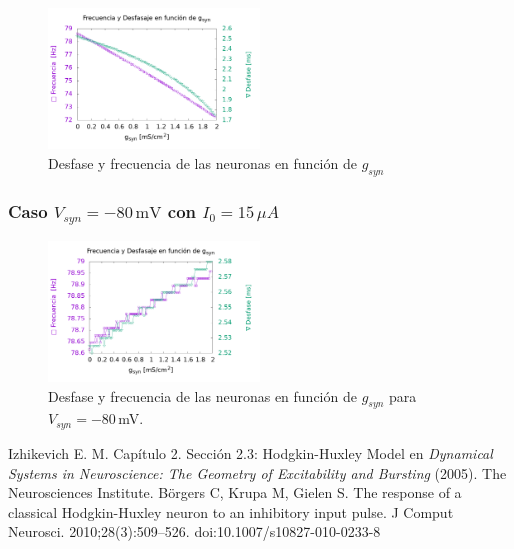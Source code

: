     \begin{figure}[H]
            \centering
            \includegraphics[width=0.5\textwidth]{../Graficos/current_15.png}
            \caption{Desfase y frecuencia de las neuronas en función de $g_{syn}$}
            \label{fig:des_fre}
        \end{figure}   


    \subsubsection{Caso \texorpdfstring{$V_{syn}= -80\,\text{mV}$}{}   con  \texorpdfstring{$I_0 = 15\,\mu A$}{}}


    \begin{figure}[H]
            \centering
            \includegraphics[width=0.5\textwidth]{../Graficos/current_15_in.png}
            \caption{Desfase y frecuencia de las neuronas en función de $g_{syn}$ para $V_{syn}=-80\,$mV.}
            \label{fig:des_fre_in}
        \end{figure}



\begin{thebibliography}{50}
{} Izhikevich E. M. Capítulo 2. Sección 2.3: Hodgkin-Huxley Model en {\sl Dynamical Systems in Neuroscience: The Geometry of Excitability and Bursting} (2005).  The Neurosciences Institute.
 Börgers C, Krupa M, Gielen S. The response of a classical Hodgkin-Huxley neuron to an inhibitory input pulse. J Comput Neurosci. 2010;28(3):509–526. doi:10.1007/s10827-010-0233-8
\end{thebibliography}

